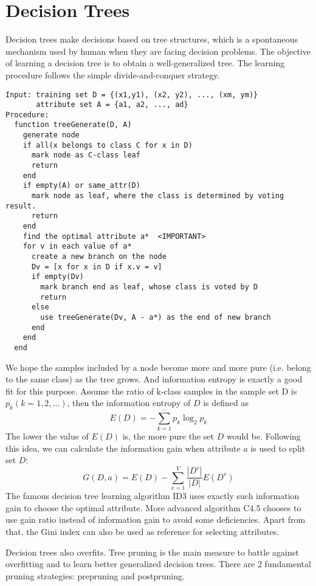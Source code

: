 \section{Decision Trees}

Decision trees make decisions based on tree structures, which is a spontaneous
mechanism used by human when they are facing decision problems. The objective
of learning a decision tree is to obtain a well-generalized tree. The learning
procedure follows the simple divide-and-conquer strategy.

\begin{lstlisting}
Input: training set D = {(x1,y1), (x2, y2), ..., (xm, ym)}
       attribute set A = {a1, a2, ..., ad}
Procedure:
  function treeGenerate(D, A)
    generate node
    if all(x belongs to class C for x in D)
      mark node as C-class leaf
      return
    end
    if empty(A) or same_attr(D)
      mark node as leaf, where the class is determined by voting result.
      return
    end
    find the optimal attribute a*  <IMPORTANT>
    for v in each value of a*
      create a new branch on the node
      Dv = [x for x in D if x.v = v]
      if empty(Dv)
        mark branch end as leaf, whose class is voted by D
        return
      else
        use treeGenerate(Dv, A - a*) as the end of new branch    
      end
    end
  end
\end{lstlisting}

We hope the samples included by a node become more and more pure (i.e. belong
to the same class) as the tree grows. And information entropy is exactly a good
fit for this purpose. Assume the ratio of k-class samples in the sample set D
is $p_k (k=1,2,\ldots)$, then the information entropy of $D$ is defined as $$
E(D) = -\sum_{k=1}^{\cdots} p_k \log _2 p_k $$ The lower the value of $E(D)$
is, the more pure the set $D$ would be. Following this idea, we can calculate
the information gain when attribute $a$ is used to split set $D$: $$ G(D,a) =
E(D) - \sum_{v=1}^V \frac{|D^v|}{|D|} E(D^v) $$ The famous decision tree
learning algorithm ID3 uses exactly such information gain to choose the optimal
attribute. More advanced algorithm C4.5 chooses to use gain ratio instead of
information gain to avoid some deficiencies. Apart from that, the Gini index
can also be used as reference for selecting attributes.

Decision trees also overfits. Tree pruning is the main measure to battle
against overfitting and to learn better generalized decision trees.
There are 2 fundamental pruning strategies: prepruning and postpruning.


